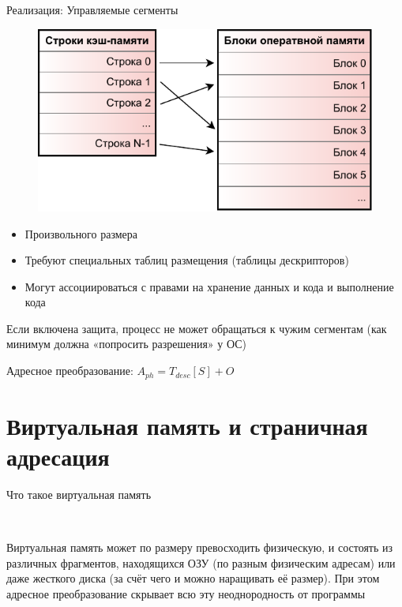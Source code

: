 \documentclass[xetex,aspectratio=43]{beamer}
\begin{document}
\begin{frame}{Реализация: Управляемые сегменты}

    \begin{figure}
        \includegraphics[page=3,height=0.55\textheight]{img/06.cache-and-vm-crop.pdf}
        \vspace{-5mm}
    \end{figure}

    \begin{itemize}
        \tightlist
        \item
        Произвольного размера
        \item
        Требуют специальных таблиц размещения (таблицы дескрипторов)
        \item
        Могут ассоциироваться с правами на хранение данных и кода и выполнение
        кода
    \end{itemize}

    \pause

    Если включена защита, процесс не может обращаться к чужим сегментам (как
    минимум должна «попросить разрешения» у ОС)

    Адресное преобразование: \(A_{ph} = T_{desc}[S] + O\)

\end{frame}

\section{Виртуальная память и страничная адресация}

\begin{frame}{Что такое виртуальная память}

    ~

    Виртуальная память может по размеру превосходить физическую, и состоять
    из различных фрагментов, находящихся ОЗУ (по разным физическим адресам)
    или даже жесткого диска (за счёт чего и можно наращивать её размер). При
    этом адресное преобразование скрывает всю эту неоднородность от
    программы
\end{frame}
\end{document}
